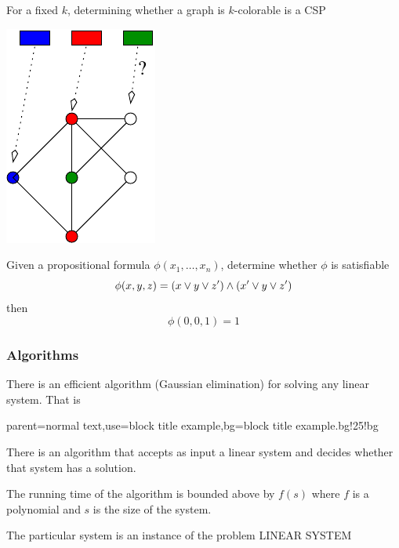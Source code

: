 \documentclass[12pt,xcolor=dvipsnames%
]{beamer}
\renewcommand{\.}{\cdot}
\let\emph=\alert
\begin{document}
\begin{frame}
  For a fixed $k$, determining whether a graph is $k$-colorable is a CSP
  \begin{center}
    \includegraphics{k-col}
  \end{center}
\end{frame}


\begin{frame}
Given a propositional formula $\phi(x_1,\dots,x_n)$, determine whether $\phi$ is satisfiable
\bigskip
\begin{equation*}
\phi(x,y,z) = (x\vee y \vee z') \wedge (x'\vee y \vee z')
\end{equation*}
then 
\begin{equation*}
\phi(0,0,1) = 1
\end{equation*}
\end{frame}

\begin{frame}
  \frametitle{Algorithms}
  There is an efficient algorithm (Gaussian elimination) for solving any
  linear system.
  That is

%
{parent=normal text,use=block title example,bg=block title example.bg!25!bg}
  \begin{exampleblock}{}
    There is an algorithm that accepts as \emph{input} a linear system
    and decides whether that system has a solution.

    \smallskip
    The running time of the algorithm is bounded above by $f(s)$ where
    $f$ is a polynomial and $s$ is the size of the system.
  \end{exampleblock}
  \pause

  The particular system is an \emph{instance} of the \emph{problem}
  LINEAR SYSTEM
  
\end{frame}
\end{document}

